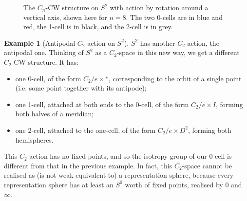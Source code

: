 \documentclass{amsart}
\theoremstyle{definition}
\newtheorem{example}[thm]{Example}
\numberwithin{thm}{section}
\begin{document}
\begin{figure}
    \centering
      \caption{The $C_n$-CW structure on $S^2$ with action by rotation around a vertical axis, shown here for $n = 8$. The two 0-cells are in blue and red, the 1-cell is in black, and the 2-cell is in grey.}
      \label{fig: rep sphere cyclic rotation}
\end{figure}

\begin{example}[Antipodal $C_2$-action on $S^2$]
    $S^2$ has another $C_2$-action, the antipodal one. Thinking of $S^2$ as a $C_2$-space in this new way, we get a different $C_2$-CW structure. It has:
    \begin{itemize}
        \item one 0-cell, of the form $C_2/e \times *$, corresponding to the orbit of a single point (i.e. some point together with its antipode);
        \item one 1-cell, attached at both ends to the 0-cell, of the form $C_2/e \times I$, forming both halves of a meridian;
        \item one 2-cell, attached to the one-cell, of the form $C_2/e \times D^2$, forming both hemispheres.
      \end{itemize}
      This $C_2$-action has no fixed points, and so the isotropy group of our 0-cell is different from that in the previous example. In fact, this $C_2$-space cannot be realised as (is not weak equivalent to) a representation sphere, because every representation sphere has at least an $S^0$ worth of fixed points, realised by $0$ and $\infty$.
\end{example}
\end{document}
